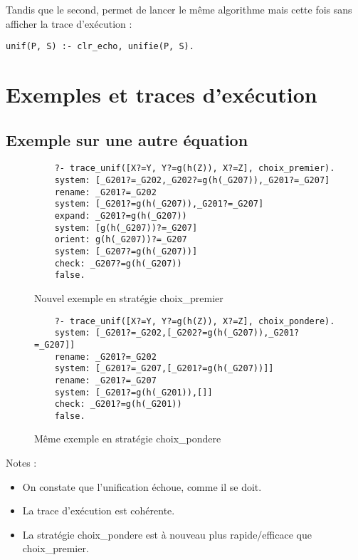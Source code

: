 \documentclass[12pt]{article} %
\begin{document}
Tandis que le second, permet de lancer le même algorithme mais cette fois sans afficher la trace d'exécution :

\begin{center}
\verb|unif(P, S) :- clr_echo, unifie(P, S).|
\end{center}

\section*{Exemples et traces d'exécution}

\subsection*{Exemple sur une autre équation}

\begin{figure}[h!]
	\begin{verbatim}
	?- trace_unif([X?=Y, Y?=g(h(Z)), X?=Z], choix_premier).
	system: [_G201?=_G202,_G202?=g(h(_G207)),_G201?=_G207]
	rename: _G201?=_G202
	system: [_G201?=g(h(_G207)),_G201?=_G207]
	expand: _G201?=g(h(_G207))
	system: [g(h(_G207))?=_G207]
	orient: g(h(_G207))?=_G207
	system: [_G207?=g(h(_G207))]
	check: _G207?=g(h(_G207))
	false.
	\end{verbatim}
	\caption{Nouvel exemple en stratégie choix\_premier}
\end{figure}

\newpage

\begin{figure}[h!]
	\begin{verbatim}
	?- trace_unif([X?=Y, Y?=g(h(Z)), X?=Z], choix_pondere).
	system: [_G201?=_G202,[_G202?=g(h(_G207)),_G201?=_G207]]
	rename: _G201?=_G202
	system: [_G201?=_G207,[_G201?=g(h(_G207))]]
	rename: _G201?=_G207
	system: [_G201?=g(h(_G201)),[]]
	check: _G201?=g(h(_G201))
	false.
	\end{verbatim}
	\caption{Même exemple en stratégie choix\_pondere}
\end{figure}

Notes :
\begin{itemize}
	\item On constate que l'unification échoue, comme il se doit.
	\item La trace d'exécution est cohérente.
	\item La stratégie choix\_pondere est à nouveau plus rapide/efficace que choix\_premier.
\end{itemize}
\end{document}
